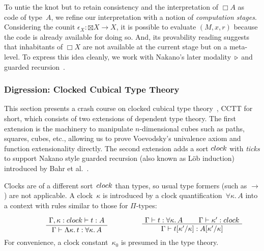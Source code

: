\documentclass[a4paper,UKenglish,numberwithinsect,cleveref,thm-restate]{lipics-v2021}
\numberwithin{equation}{section}
\theoremstyle{plain}
\begin{document}
To untie the knot but to retain consistency and the interpretation of $\Box A$ as code of type~$A$, we refine our interpretation with a notion of \emph{computation stages}. 
Considering the counit $\epsilon_X\colon \boxtimes X \to X$, it is possible to evaluate $(M, x, r)$ because the code is already available for doing so.
And, its provability reading suggests that inhabitants of $\Box X$ are not available at the current stage but on a meta-level.
To express this idea cleanly, we work with Nakano's later modality~$\mathord{\triangleright}$ and guarded recursion~\cite{Nakano2000}.

\subsubsection{Digression: Clocked Cubical Type Theory}
This section presents a crash course on clocked cubical type theory~\cite{Kristensen2021}, CCTT for short, which consists of two extensions of dependent type theory.
The first extension is the machinery to manipulate $n$-dimensional cubes such as paths, squares, cubes, etc., allowing us to prove Voevodsky’s univalence axiom and function extensionality directly.
The second extension adds a sort $\clock$ with \emph{ticks} to support Nakano style guarded recursion (also known as Löb induction) introduced by Bahr et al.~\cite{Bahr2017}.

Clocks are of a different sort~$\clock$ than types, so usual type formers (such as $\to$) are not applicable.
A clock~$\kappa$ is introduced by a clock quantification~$\forall \kappa.\, A$ into a context with rules similar to those for $\Pi$-types:
\[
  \begin{minipage}{0.47\linewidth}
    \begin{prooftree}
      \AxiomC{$\Gamma, \kappa : \clock \vdash t : A$}
      \UnaryInfC{$\Gamma \vdash \Lambda \kappa.\, t : \forall \kappa.\, A $}
    \end{prooftree}
  \end{minipage}
  \begin{minipage}{0.47\linewidth}
    \begin{prooftree}
      \AxiomC{$\Gamma \vdash t : \forall \kappa.\, A$}
      \AxiomC{$\Gamma \vdash \kappa' : \clock $}
      \BinaryInfC{$\Gamma \vdash t[\kappa'/\kappa] : A[\kappa'/\kappa]$}
    \end{prooftree}
  \end{minipage}
\]
For convenience, a clock constant~$\kappa_0$ is presumed in the type theory.
\end{document}
